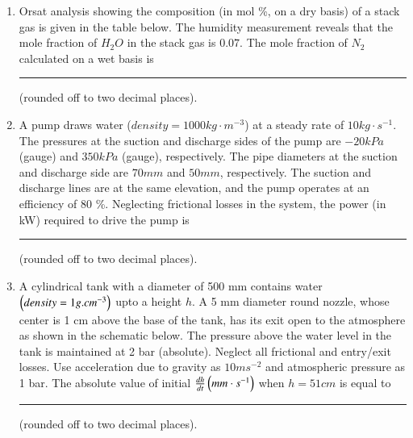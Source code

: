 \documentclass[journal,12pt,onecolumn]{IEEEtran}
\theoremstyle{remark}
\begin{document}
\begin{enumerate}
    \hfill{}
    \item Orsat analysis showing the composition (in mol \%, on a dry basis) of a stack gas is given in the table below. The humidity measurement reveals that the mole fraction of $H_2O$ in the stack gas is $0.07$. The mole fraction of $N_2$ calculated on a wet basis is \rule{40pt}{0.1mm}(rounded off to two decimal places).

    \hfill{}
    
    \item A pump draws water ($density = 1000 kg\cdot m^{-3}$) at a steady rate of $10 kg\cdot s^{-1}$. The pressures at the suction and discharge sides of the pump are $-20 kPa$ (gauge) and $350 kPa$ (gauge), respectively. The pipe diameters at the suction and discharge side are $70 mm$ and $50 mm$, respectively. The suction and discharge lines are at the same elevation, and the pump operates at an efficiency of 80 \%. Neglecting frictional losses in the system, the power (in kW) required to drive the pump is \rule{40pt}{0.1mm}(rounded off to two decimal places).

    \hfill{}
    \item A cylindrical tank with a diameter of 500 mm contains water $\left(density = 1 g.cm^{-3}\right)$ upto a height $h$. A 5 mm diameter round nozzle, whose center is 1 cm above the base of the tank, has its exit open to the atmosphere as shown in the schematic below. The pressure above the water level in the tank is maintained at 2 bar (absolute). Neglect all frictional and entry/exit losses. Use acceleration due to gravity as $10 ms^{-2}$ and atmospheric pressure as 1 bar. The absolute value of initial $\frac{dh}{dt}\left(mm\cdot s^{-1}\right)$ when $h = 51 cm$ is equal to \rule{40pt}{0.1mm}(rounded off to two decimal places).


\end{enumerate}
\end{document}
